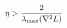 \documentclass[preview]{standalone}
\begin{document}
\begin{align*}
\special{dvisvgm:raw <g id='unique000'>}\eta > \frac{2}{\lambda_{\max}(\nabla^2 L)}\special{dvisvgm:raw </g>}
\end{align*}
\end{document}
